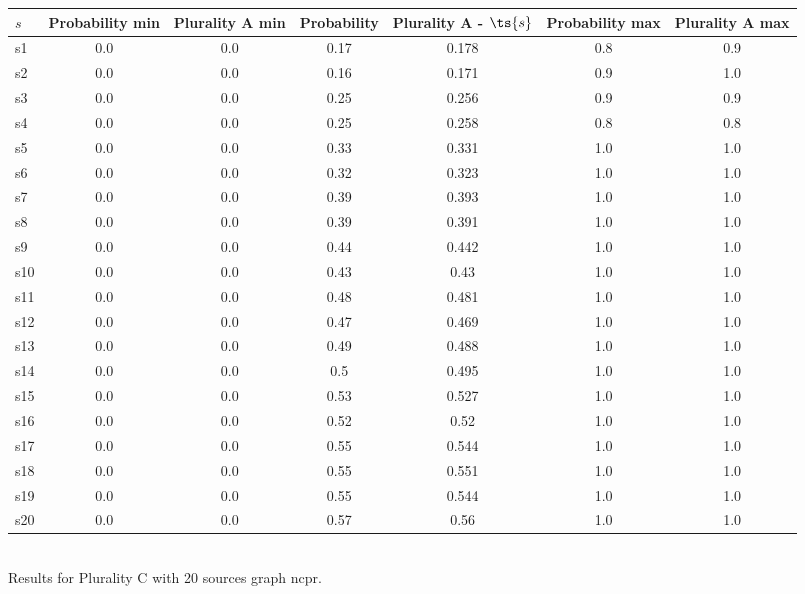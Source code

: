 \documentclass{article}
\begin{document}
\noindent\begin{tabular}{|l|c|c|c|c|c|c|}
\hline
$s$& Probability min & Plurality A min & Probability & Plurality A - $\ts{s}$ & Probability max & Plurality A max\\
\hline
s1 &0.0 & 0.0 & 0.17 & 0.178 & 0.8 & 0.9\\
\hline
s2 &0.0 & 0.0 & 0.16 & 0.171 & 0.9 & 1.0\\
\hline
s3 &0.0 & 0.0 & 0.25 & 0.256 & 0.9 & 0.9\\
\hline
s4 &0.0 & 0.0 & 0.25 & 0.258 & 0.8 & 0.8\\
\hline
s5 &0.0 & 0.0 & 0.33 & 0.331 & 1.0 & 1.0\\
\hline
s6 &0.0 & 0.0 & 0.32 & 0.323 & 1.0 & 1.0\\
\hline
s7 &0.0 & 0.0 & 0.39 & 0.393 & 1.0 & 1.0\\
\hline
s8 &0.0 & 0.0 & 0.39 & 0.391 & 1.0 & 1.0\\
\hline
s9 &0.0 & 0.0 & 0.44 & 0.442 & 1.0 & 1.0\\
\hline
s10 &0.0 & 0.0 & 0.43 & 0.43 & 1.0 & 1.0\\
\hline
s11 &0.0 & 0.0 & 0.48 & 0.481 & 1.0 & 1.0\\
\hline
s12 &0.0 & 0.0 & 0.47 & 0.469 & 1.0 & 1.0\\
\hline
s13 &0.0 & 0.0 & 0.49 & 0.488 & 1.0 & 1.0\\
\hline
s14 &0.0 & 0.0 & 0.5 & 0.495 & 1.0 & 1.0\\
\hline
s15 &0.0 & 0.0 & 0.53 & 0.527 & 1.0 & 1.0\\
\hline
s16 &0.0 & 0.0 & 0.52 & 0.52 & 1.0 & 1.0\\
\hline
s17 &0.0 & 0.0 & 0.55 & 0.544 & 1.0 & 1.0\\
\hline
s18 &0.0 & 0.0 & 0.55 & 0.551 & 1.0 & 1.0\\
\hline
s19 &0.0 & 0.0 & 0.55 & 0.544 & 1.0 & 1.0\\
\hline
s20 &0.0 & 0.0 & 0.57 & 0.56 & 1.0 & 1.0\\
\hline
\end{tabular}\\

\noindent Results for Plurality C with 20 sources graph ncpr.
\end{document}
